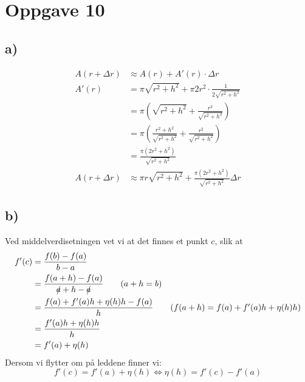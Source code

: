\documentclass{article}
\begin{document}
\section*{Oppgave 10}
\subsection*{a)}
\begin{align*}
	A(r+\Delta r)&\approx A(r) + A'(r)\cdot \Delta r\\
	A'(r) &= \pi \sqrt{r^2+h^2} + \pi 2r^2 \cdot \frac{1}{2\sqrt{r^2 + h^2}} \\
	&= \pi\left(\sqrt{r^2+h^2} + \frac{r^2}{\sqrt{r^2+h^2}}\right)\\
	&= \pi\left( \frac{r^2+h^2}{\sqrt{r^2+h^2}} + \frac{r^2}{\sqrt{r^2+h^2}} \right)\\
	&= \frac{\pi (2r^2 + h^2)}{\sqrt{r^2+h^2}}\\
	A(r+\Delta r) &\approx \pi r \sqrt{r^2+h^2} + \frac{\pi (2r^2 + h^2)}{\sqrt{r^2+h^2}} \Delta r
\end{align*}
\subsection*{b)}

Ved middelverdisetningen vet vi at det finnes et punkt $c$, slik at
\begin{align*}
f'(c)&=\frac{f(b) - f(a)}{b - a}\\
&= \frac{f(a+h) - f(a)}{\slashed{a} + h - \slashed{a}}\tag{$a+h = b$}\\
&= \frac{f(a) + f'(a)h + \eta(h)h - f(a)}{h}\tag{$f(a+h) = f(a) + f'(a)h + \eta(h)h$}\\
&= \frac{f'(a)h + \eta(h)h}{h}\\
&= f'(a) + \eta(h)
\end{align*}
Dersom vi flytter om på leddene finner vi:
$$f'(c) = f'(a) + \eta(h) \iff \eta(h) = f'(c) - f'(a)$$
\end{document}
